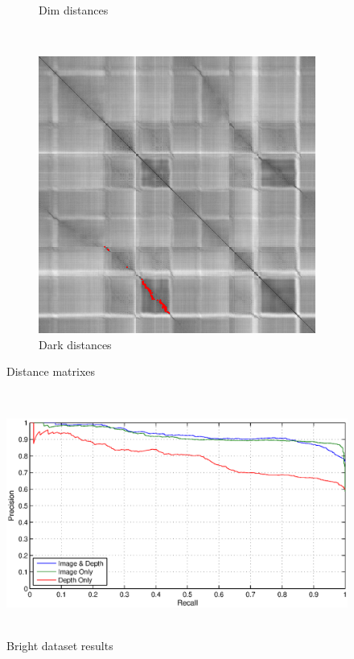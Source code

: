 \documentclass[]{spie}  %
\begin{document}
\begin{figure}[!htb]
\begin{subfigure}[b]{0.27\textwidth}
        \caption{Dim distances}
        \label{subfig:dist_dim}
        \end{subfigure}
         ~ 
        \begin{subfigure}[b]{0.27\textwidth}
        \centering
        \includegraphics[trim = 0mm 0mm 0mm 0mm, clip, width=\textwidth]{figures/dist_dark.png}    
        \caption{Dark distances}
        \label{subfig:dist_dark}
        \end{subfigure}
        
        \hspace{-3mm}
        \caption{Distance matrixes}
        \label{fig:dist_matrices}
\end{figure}



\begin{figure}[!htb]
        \centering
        \includegraphics[trim = 0mm 0mm 0mm 0mm, clip, height=8cm]{figures/pr_bright.eps}    
        \caption{Bright dataset results}
        \label{fig:pr_bright}
\end{figure}
\end{document}
